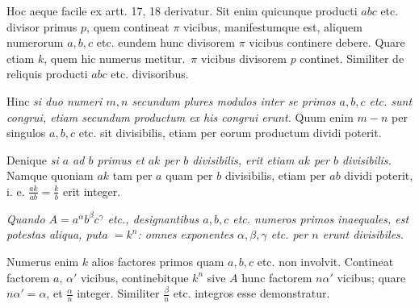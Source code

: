 Hoc aeque facile ex artt. 17, 18 derivatur. Sit enim quicunque producti $abc$ etc. divisor primus $p$, quem contineat $\pi$ vicibus, manifestumque est, aliquem numerorum $a, b, c$ etc. eundem hunc divisorem $\pi$ vicibus continere debere. Quare etiam $k$, quem hic numerus metitur.\ $\pi$ vicibus divisorem $p$ continet. Similiter de reliquis producti $abc$ etc. divisoribus.

Hinc \emph{si duo numeri $m, n$ secundum plures modulos inter se primos $a, b, c$ etc. sunt congrui, etiam secundum productum ex his congrui erunt.} Quum enim $m-n$ per singulos $a, b, c$ etc. sit divisibilis, etiam per eorum productum dividi poterit.

Denique \emph{si $a$ ad $b$ primus et $ak$ per $b$ divisibilis, erit etiam $ak$ per $b$ divisibilis.} Namque quoniam $ak$ tam per $a$ quam per $b$ divisibilis, etiam per $ab$ dividi poterit, i. e. $\frac{ak}{ab}=\frac{k}{b}$ erit integer.

\emph{Quando $A=a^\alpha b^\beta c^\gamma$ etc., designantibus $a, b, c$ etc. numeros primos inaequales, est potestas aliqua, puta $=k^n$: omnes exponentes $\alpha, \beta, \gamma$ etc. per $n$ erunt divisibiles.}

Numerus enim $k$ alios factores primos quam $a, b, c$ etc. non involvit. Contineat factorem $a$, $\alpha'$ vicibus, continebitque $k^n$ sive $A$ hunc factorem $n\alpha'$ vicibus; quare $n\alpha'=\alpha$, et $\frac{\alpha}{n}$ integer. Similiter $\frac{\beta}{n}$ etc. integros esse demonstratur.
